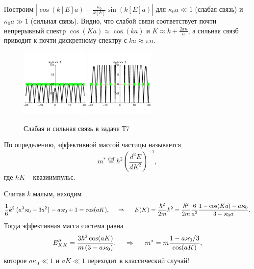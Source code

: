 Построим $|\cos (k[E] a) - \tfrac{\kappa_0}{k[E]} \sin (k[E]a)|$ для $\kappa_0 a \ll 1$ (слабая связь) 
и $\kappa_0 a \gg 1$ (сильная связь). Видно, что слабой связи соответствует почти непрерывный спектр $\cos (Ka) \approx \cos (k a)$ и $K \approx k + \frac{2\pi n}{a}$, а сильная связб приводит к почти дискретному спектру с $ka \approx \pi n$. 
\begin{figure}[ht]
    \centering
    \includegraphics[width=0.3\textwidth]{figures/T7_1.pdf}
    \hspace{5 mm} 
    \includegraphics[width=0.3\textwidth]{figures/T7_2.pdf}
    \caption{Слабая и сильная связь в задаче Т7}
\end{figure}

По определению, эффективной массой частицы называется
\begin{equation*}
    m^* \overset{\mathrm{def}}{=} \hbar^2 \left(\frac{d^2 E}{d K^2} \right)^{-1},
\end{equation*}
где $\hbar K$ -- квазиимпульс. 

Считая $k$ малым, находим
\begin{equation*}
    \frac{1}{6} k^2 \left(a^3 \kappa _0-3 a^2\right)-a \kappa _0+1=\cos (a K),
    \hspace{0.5cm} \Rightarrow \hspace{0.5cm}
    E(K) = \frac{\hbar^2}{2m} k^2 = \frac{\hbar^2}{2m} \frac{6}{a^2} \frac{1 - \cos(K a) - a \kappa_0}{3 - \kappa_0 a}.
\end{equation*}
Тогда эффективная масса система равна
\begin{equation*}
    E''_{KK} = \frac{3 \hbar ^2 \cos (a K)}{m \left(3-a \kappa _0\right)}
    , \hspace{0.5cm} \Rightarrow \hspace{0.5cm}
    m^*= m \frac{1 - a \kappa_0/3}{\cos(a K)},
\end{equation*}
которое $a \kappa_0 \ll 1$ и $a K \ll 1$ переходит в классический случай! 
